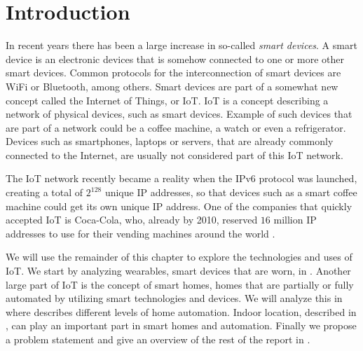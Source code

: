 \chapter{Introduction}\label{chap:introduction}
In recent years there has been a large increase in so-called \emph{smart devices}. 
A smart device is an electronic devices that is somehow connected to one or more other smart devices. 
Common protocols for the interconnection of smart devices are WiFi or Bluetooth, among others.
Smart devices are part of a somewhat new concept called the Internet of Things, or IoT. 
IoT is a concept describing a network of physical devices, such as smart devices. 
Example of such devices that are part of a network could be a coffee machine, a watch or even a refrigerator. 
Devices such as smartphones, laptops or servers, that are already commonly connected to the Internet, are usually not considered part of this IoT network. 

The IoT network recently became a reality when the IPv6 protocol was launched,
creating a total of $2^{128}$ unique IP addresses, 
so that devices such as a smart coffee machine could get its own unique IP address. 
One of the companies that quickly accepted IoT is Coca-Cola, 
who, already by 2010, reserved $16$ million IP addresses to use for \eg their vending machines around the world \cite{coke-iot}. 

We will use the remainder of this chapter to explore the technologies and uses of IoT. 
We start by analyzing wearables, \ie smart devices that are worn, in .
Another large part of IoT is the concept of smart homes, \ie homes that are partially or fully automated by utilizing smart technologies and devices. 
We will analyze this in  where  describes different levels of home automation. 
Indoor location, described in , can play an important part in smart homes and automation.
Finally we propose a problem statement  and give an overview of the rest of the report in .







